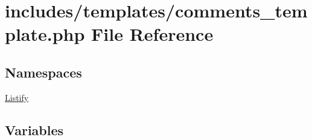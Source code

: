 \hypertarget{comments__template_8php}{}\section{includes/templates/comments\+\_\+template.php File Reference}
\label{comments__template_8php}
\subsection*{Namespaces}
\begin{DoxyCompactItemize}
\item 
 \hyperlink{namespace_listify}{Listify}
\end{DoxyCompactItemize}
\subsection*{Variables}

